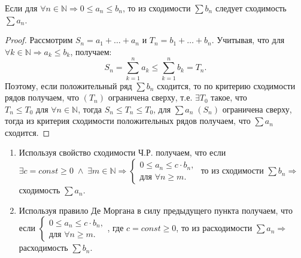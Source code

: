 \begin{theorem}
	Если для $\forall n \in \mathbb{N} \Rightarrow 0 \leqslant a_n \leqslant b_n$, то из
	сходимости $\sum b_n$ следует сходимость $\sum a_n$.
\end{theorem}
\begin{proof}
	Рассмотрим ${S_n = a_1 + \ldots + a_n}$ и $T_n = b_1 + \ldots + b_n$. Учитывая, что
	для $\forall k \in \mathbb{N} \Rightarrow a_k \leqslant b_k$, получаем:
	\begin{equation*}
		S_n = \sum\limits_{k = 1}^na_k \leqslant \sum\limits_{k = 1}^nb_k = T_n.
	\end{equation*}
	Поэтому, если положительный ряд	 $\sum b_n$ сходится, то по критерию сходимости рядов
	получаем, что $(T_n)$ ограничена сверху, т.е. $\exists T_0$ такое, что
	$T_n \leqslant T_0 \text{ для }\forall n \in \mathbb{N}$, тогда ${S_n \leqslant T_n \leqslant T_0}$,
	для $\sum a_n \; (S_n)$ ограничена сверху, тогда из критерия сходимости положительных рядов получаем,
	что $\sum a_n$ сходится.
\end{proof}

\begin{note}
	\begin{enumerate}
		\item Используя свойство сходимости Ч.Р. получаем, что если $\exists c = const \geqslant 0 \; \wedge \; \exists m \in \mathbb{N} \Rightarrow \begin{cases}
		0 \leqslant a_n \leqslant c \cdot b_n, \\
		\text{для } \forall n \geqslant m.
		\end{cases}$ то из сходимости $\sum b_n \Rightarrow$ сходимость $\sum a_n$.
		\item Используя правило Де Моргана в силу предыдущего пункта получаем, что если $\begin{cases}
		0 \leqslant a_n \leqslant c \cdot b_n, \\
		\text{для } \forall n \geqslant m.
		\end{cases}$, где $c = const \geqslant 0$, то из расходимости $\sum a_n \Rightarrow$ расходимость $\sum b_n$.
	\end{enumerate}
\end{note}

